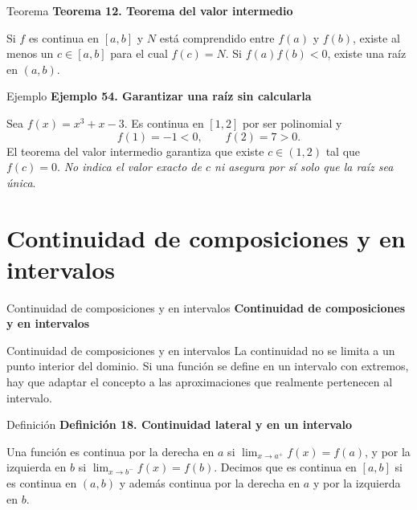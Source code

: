 \documentclass[12pt,aspectratio=169]{beamer}
\begin{document}
\begin{frame}[t,allowframebreaks]{Teorema}
{\color{azul}\bfseries Teorema 12. Teorema del valor intermedio}\par\medskip

Si $f$ es continua en $[a,b]$ y $N$ está comprendido entre $f(a)$ y $f(b)$, existe al menos un $c\in[a,b]$ para el cual $f(c)=N$. Si $f(a)f(b)<0$, existe una raíz en $(a,b)$.
\end{frame}


\begin{frame}[t,allowframebreaks]{Ejemplo}
{\color{azul}\bfseries Ejemplo 54. Garantizar una raíz sin calcularla}\par\medskip

Sea $f(x)=x^3+x-3$. Es continua en $[1,2]$ por ser polinomial y
\[
 f(1)=-1<0,\qquad f(2)=7>0.
\]
El teorema del valor intermedio garantiza que existe $c\in(1,2)$ tal que $f(c)=0$. \emph{No indica el valor exacto de $c$ ni asegura por sí solo que la raíz sea única}.
\end{frame}


\section{Continuidad de composiciones y en intervalos}

\begin{frame}[t]{Continuidad de composiciones y en intervalos}
\centering\vfill{\Large\bfseries\color{azul} Continuidad de composiciones y en intervalos}\vfill
\end{frame}


\begin{frame}[t,allowframebreaks]{Continuidad de composiciones y en intervalos}
La continuidad no se limita a un punto interior del dominio. Si una función se define en un intervalo con extremos, hay que adaptar el concepto a las aproximaciones que realmente pertenecen al intervalo.
\end{frame}


\begin{frame}[t,allowframebreaks]{Definición}
{\color{azul}\bfseries Definición 18. Continuidad lateral y en un intervalo}\par\medskip

Una función es continua por la derecha en $a$ si $\lim_{x\to a^+}f(x)=f(a)$, y por la izquierda en $b$ si $\lim_{x\to b^-}f(x)=f(b)$. Decimos que es continua en $[a,b]$ si es continua en $(a,b)$ y además continua por la derecha en $a$ y por la izquierda en $b$.
\end{frame}
\end{document}
